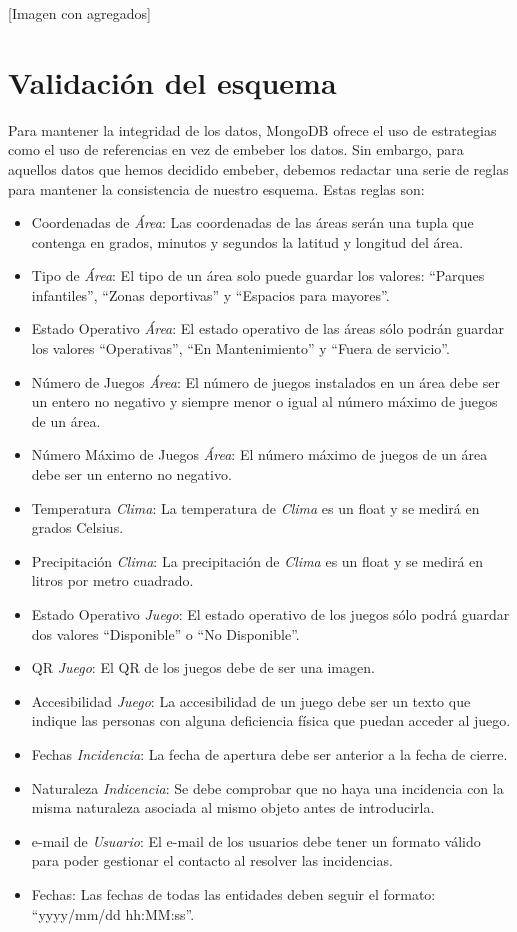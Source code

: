 \documentclass[]{article}
\begin{document}
[Imagen con agregados]


\section{Validación del esquema}
\label{sec:esquema}
Para mantener la integridad de los datos, MongoDB ofrece el uso de estrategias como el uso de referencias en vez de embeber los datos. Sin embargo, para aquellos datos que hemos decidido embeber, debemos redactar una serie de reglas para mantener la consistencia de nuestro esquema. Estas reglas son:
\begin{itemize}
    \item Coordenadas de \textit{Área}: Las coordenadas de las áreas serán una tupla que contenga en grados, minutos y segundos la latitud y longitud del área.
    \item Tipo de \textit{Área}: El tipo de un área solo puede guardar los valores: ``Parques infantiles'', ``Zonas deportivas'' y ``Espacios para mayores''.
    \item Estado Operativo \textit{Área}: El estado operativo de las áreas sólo podrán guardar los valores ``Operativas'', ``En Mantenimiento'' y ``Fuera de servicio''.
    \item Número de Juegos \textit{Área}: El número de juegos instalados en un área debe ser un entero no negativo y siempre menor o igual al número máximo de juegos de un área.
    \item Número Máximo de Juegos \textit{Área}: El número máximo de juegos de un área debe ser un enterno no negativo.
    \item Temperatura \textit{Clima}: La temperatura de \textit{Clima} es un float y se medirá en grados Celsius.
    \item Precipitación \textit{Clima}: La precipitación de \textit{Clima} es un float y se medirá en litros por metro cuadrado.
    \item Estado Operativo \textit{Juego}: El estado operativo de los juegos sólo podrá guardar dos valores ``Disponible'' o ``No Disponible''.
    \item QR \textit{Juego}: El QR de los juegos debe de ser una imagen.
    \item Accesibilidad \textit{Juego}: La accesibilidad de un juego debe ser un texto que indique las personas con alguna deficiencia física que puedan acceder al juego.
    \item Fechas \textit{Incidencia}: La fecha de apertura debe ser anterior a la fecha de cierre.
    \item Naturaleza \textit{Indicencia}: Se debe comprobar que no haya una incidencia con la misma naturaleza asociada al mismo objeto antes de introducirla.
    \item e-mail de \textit{Usuario}: El e-mail de los usuarios debe tener un formato válido para poder gestionar el contacto al resolver las incidencias.
    \item Fechas: Las fechas de todas las entidades deben seguir el formato: ``yyyy/mm/dd hh:MM:ss''.
\end{itemize}
\end{document}
